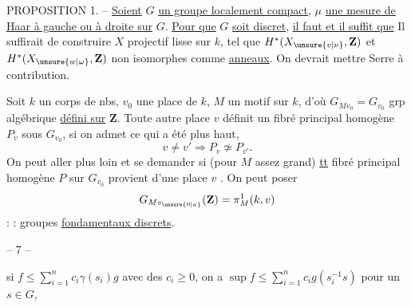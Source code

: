 PROPOSITION 1. -- \uline{Soient} $G$ \uline{un groupe localement compact},
$\mu$ \uline{une mesure de Haar à gauche ou à droite sur} $G$.
\uline{Pour que} $G$ \uline{soit discret}, \uline{il faut et il suffit que}
Il suffirait de construire $X$ projectif lisse sur $k$, tel que
$H^*(X_{\unsure{v|\nu}},\mathbf Z)$ et $H^*(X_{\unsure{w|\omega}},\mathbf Z)$
non isomorphes comme \uline{anneaux}.
On devrait mettre Serre à contribution.

Soit $k$ un corps de nbs, $v_0$ une place de $k$, $M$ un motif sur $k$,
d’où $G_{Mv_0}=G_{v_0}$ grp algébrique \uline{défini sur} $\mathbf Z$.
Toute autre place  $v$ définit un fibré principal homogène
$P_v$ sous $G_{v_0}$,
 si on admet ce qui a été  plus haut,
\[
v\ne v'\Longrightarrow P_v\not\simeq P_{v'}.
\]
On peut aller plus loin et se demander si 
(pour $M$ assez grand) \uline{tt} fibré principal homogène $P$ sur $G_{v_0}$
provient d’une place $v$ .
 On  peut poser
\[
G_{Mv_{\unsure{0|a}}}(\mathbf Z)=\pi^1_M(k,v)
\]
 :   
 : groupes \uline{fondamentaux  discrets}.
\begin{center}-- 7 --\end{center}
si $f\le\sum_{i=1}^n c_i\gamma(s_i)g$ avec des $c_i\ge0$,
on a $\sup f\le\sum_{i=1}^n c_i g(s_i^{-1}s)$ pour un $s\in G$,
